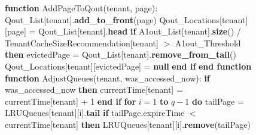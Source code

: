 \newpage

\begin{figure}[htbp]
    \centering
    \begin{minipage}{\linewidth}
    \begin{algorithm}[H]
        \begin{algorithmic}
            \STATE \textbf{function} AddPageToQout(tenant, page):
            \STATE \hspace{\algorithmicindent} Qout\_List[tenant].\textbf{add\_to\_front}(page)
            \STATE \hspace{\algorithmicindent} Qout\_Locations[tenant][page] = Qout\_List[tenant].\textbf{head}
            \STATE \hspace{\algorithmicindent} \textbf{if} A1out\_List[tenant].\textbf{size}() / TenantCacheSizeRecommendation[tenant] $>$ A1out\_Threshold \textbf{then}
            \STATE \hspace{\algorithmicindent} \hspace{\algorithmicindent} evictedPage = Qout\_List[tenant].\textbf{remove\_from\_tail}()
            \STATE \hspace{\algorithmicindent} \hspace{\algorithmicindent} Qout\_Locations[tenant][evictedPage] = \textbf{null}
            \STATE \hspace{\algorithmicindent} \textbf{end if}
            \STATE \textbf{end function}
            \STATE 
            \STATE \textbf{function} AdjustQueues(tenant, was\_accessed\_now):
            \STATE \hspace{\algorithmicindent} \textbf {if} was\_accessed\_now \textbf{then}
            \STATE \hspace{\algorithmicindent} \hspace{\algorithmicindent} currentTime[tenant] = currentTime[tenant] + 1
            \STATE \hspace{\algorithmicindent} \textbf{end if}
            \STATE \hspace{\algorithmicindent} \textbf{for} $i = 1$ \textbf{to} $q - 1$ \textbf{do}
            \STATE \hspace{\algorithmicindent} \hspace{\algorithmicindent} tailPage = LRUQueues[tenant][i].\textbf{tail}
            \STATE \hspace{\algorithmicindent} \hspace{\algorithmicindent} \textbf{if} tailPage.expireTime $<$ currentTime[tenant] \textbf{then}
            \STATE \hspace{\algorithmicindent} \hspace{\algorithmicindent} \hspace{\algorithmicindent} LRUQueues[tenant][i].\textbf{remove}(tailPage)

\end{algorithmic}
\end{algorithm}
\end{minipage}
\end{figure}
